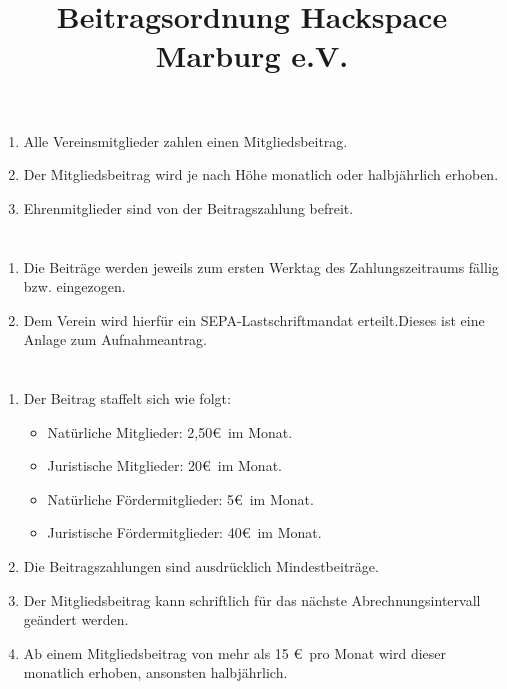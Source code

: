 \documentclass[10pt,conference,a4paper,onecolumn,nofonttune]{IEEEtran}
\begin{document}
 
  
\title{Beitragsordnung Hackspace Marburg e.V.}

\maketitle


\section{}
\begin{enumerate}
  \item Alle Vereinsmitglieder zahlen einen Mitgliedsbeitrag.

  \item Der Mitgliedsbeitrag wird je nach Höhe monatlich oder halbjährlich
    erhoben.

  \item Ehrenmitglieder sind von der Beitragszahlung befreit.
\end{enumerate}


\section{}
\begin{enumerate}
  \item Die Beiträge werden jeweils zum ersten Werktag des Zahlungszeitraums
    fällig bzw. eingezogen.

  \item Dem Verein wird hierfür ein SEPA-Lastschriftmandat erteilt.Dieses ist
    eine Anlage zum Aufnahmeantrag.
\end{enumerate}
  

\section{} 
\begin{enumerate}
  \item Der Beitrag staffelt sich wie folgt:
    \begin{itemize}
      \item Natürliche Mitglieder: 2,50\euro\ im Monat.
      \item Juristische Mitglieder: 20\euro\ im Monat.
      \item Natürliche Fördermitglieder: 5\euro\ im Monat.
      \item Juristische Fördermitglieder: 40\euro\ im Monat.
    \end{itemize}

  \item Die Beitragszahlungen sind ausdrücklich Mindestbeiträge.

  \item Der Mitgliedsbeitrag kann schriftlich für das nächste
    Abrechnungsintervall geändert werden.

  \item Ab einem Mitgliedsbeitrag von mehr als 15 \euro\ pro Monat wird dieser
    monatlich erhoben, ansonsten halbjährlich.
\end{enumerate}
\end{document}
